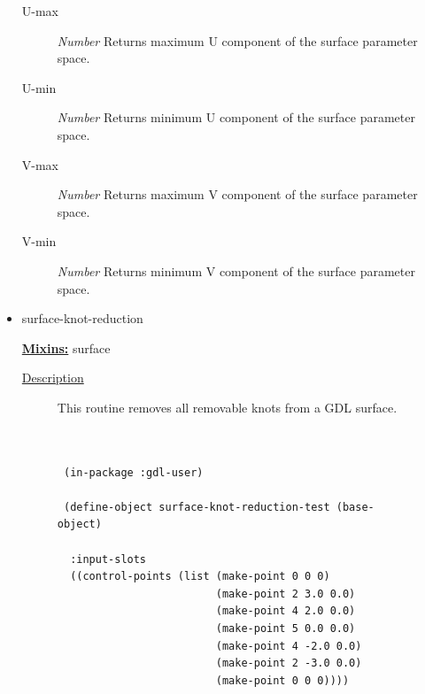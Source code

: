 \documentclass [11pt]{book}
\begin{document}
\begin{itemize}
\begin{description}
\item [U-max]
\emph{Number} Returns maximum U component of the surface parameter space.


\item [U-min]
\emph{Number} Returns minimum U component of the surface parameter space.


\item [V-max]
\emph{Number} Returns maximum V component of the surface parameter space.


\item [V-min]
\emph{Number} Returns minimum V component of the surface parameter space.


\end{description}







\item {}surface-knot-reduction


\textbf{
\underline{Mixins:}} surface





\begin{description}

\item [
\underline{Description}]


This routine  removes  all  removable  knots  from a GDL surface.



\end{description}




\begin{figure}
\begin{lrbox}{\boxedverb}
\begin{minipage}{\linewidth}
{\small

\begin{verbatim}

 
 (in-package :gdl-user)

 (define-object surface-knot-reduction-test (base-object) 

  :input-slots
  ((control-points (list (make-point 0 0 0)
                         (make-point 2 3.0 0.0) 
                         (make-point 4 2.0 0.0) 
                         (make-point 5 0.0 0.0) 
                         (make-point 4 -2.0 0.0) 
                         (make-point 2 -3.0 0.0) 
                         (make-point 0 0 0))))


\end{verbatim}}
\end{minipage}
\end{lrbox}
\end{figure}
\end{itemize}
\end{document}
